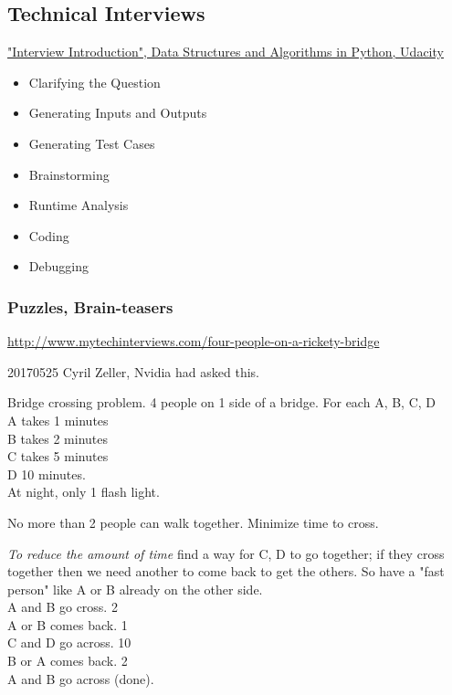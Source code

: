 \documentclass[10pt]{amsart}
\begin{document}
\begin{multicols*}{2}
\part{Technical Interviews}

\href{https://classroom.udacity.com/courses/ud513/lessons/7707710408/concepts/77114606610923}{"Interview Introduction", Data Structures and Algorithms in Python, Udacity}

\begin{itemize}
	\item Clarifying the Question
	\item Generating Inputs and Outputs
	\item Generating Test Cases
	\item Brainstorming
	\item Runtime Analysis
	\item Coding
	\item Debugging
\end{itemize}

\section{Puzzles, Brain-teasers}

\url{http://www.mytechinterviews.com/four-people-on-a-rickety-bridge}

20170525 Cyril Zeller, Nvidia had asked this.

Bridge crossing problem. 4 people on 1 side of a bridge. For each A, B, C, D \\
A takes 1 minutes \\
B takes 2 minutes \\
C takes 5 minutes \\
D 10 minutes. \\

At night, only 1 flash light.

No more than 2 people can walk together. Minimize time to cross.

\emph{To reduce the amount of time} find a way for C, D to go together; if they cross together then we need another to come back to get the others. So have a "fast person" like A or B already on the other side. \\

A and B go cross. 2 \\
A or B comes back. 1 \\
C and D go across. 10 \\
B or A comes back. 2 \\
A and B go across (done). \\


\end{multicols*}
\end{document}

